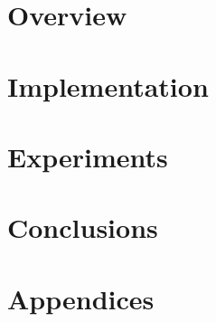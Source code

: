 \documentclass[xetex,xcolor=pdftex,dvipsnames,table,%
	       10pt, a4paper, twoside, openany]{book}
\begin{document}
\frontmatter


\mainmatter
\part{Overview}
\label{pt:overview}


\part{Implementation}
\label{pt:implementation}

\part{Experiments}
\label{pt:experiments}


\part{Conclusions}
\label{pt:conclusions}

\part{Appendices}
\label{pt:appendices}


\backmatter

\end{document}
